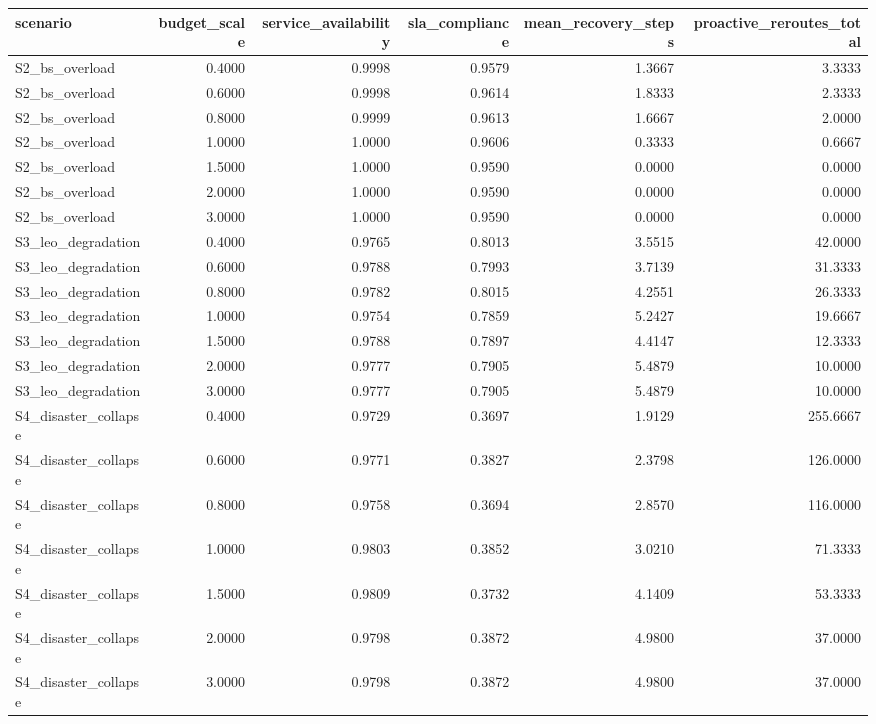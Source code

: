 \begin{tabular}{lrrrrr}
\toprule
scenario & budget\_scale & service\_availability & sla\_compliance & mean\_recovery\_steps & proactive\_reroutes\_total \\
\midrule
S2\_bs\_overload & 0.4000 & 0.9998 & 0.9579 & 1.3667 & 3.3333 \\
S2\_bs\_overload & 0.6000 & 0.9998 & 0.9614 & 1.8333 & 2.3333 \\
S2\_bs\_overload & 0.8000 & 0.9999 & 0.9613 & 1.6667 & 2.0000 \\
S2\_bs\_overload & 1.0000 & 1.0000 & 0.9606 & 0.3333 & 0.6667 \\
S2\_bs\_overload & 1.5000 & 1.0000 & 0.9590 & 0.0000 & 0.0000 \\
S2\_bs\_overload & 2.0000 & 1.0000 & 0.9590 & 0.0000 & 0.0000 \\
S2\_bs\_overload & 3.0000 & 1.0000 & 0.9590 & 0.0000 & 0.0000 \\
S3\_leo\_degradation & 0.4000 & 0.9765 & 0.8013 & 3.5515 & 42.0000 \\
S3\_leo\_degradation & 0.6000 & 0.9788 & 0.7993 & 3.7139 & 31.3333 \\
S3\_leo\_degradation & 0.8000 & 0.9782 & 0.8015 & 4.2551 & 26.3333 \\
S3\_leo\_degradation & 1.0000 & 0.9754 & 0.7859 & 5.2427 & 19.6667 \\
S3\_leo\_degradation & 1.5000 & 0.9788 & 0.7897 & 4.4147 & 12.3333 \\
S3\_leo\_degradation & 2.0000 & 0.9777 & 0.7905 & 5.4879 & 10.0000 \\
S3\_leo\_degradation & 3.0000 & 0.9777 & 0.7905 & 5.4879 & 10.0000 \\
S4\_disaster\_collapse & 0.4000 & 0.9729 & 0.3697 & 1.9129 & 255.6667 \\
S4\_disaster\_collapse & 0.6000 & 0.9771 & 0.3827 & 2.3798 & 126.0000 \\
S4\_disaster\_collapse & 0.8000 & 0.9758 & 0.3694 & 2.8570 & 116.0000 \\
S4\_disaster\_collapse & 1.0000 & 0.9803 & 0.3852 & 3.0210 & 71.3333 \\
S4\_disaster\_collapse & 1.5000 & 0.9809 & 0.3732 & 4.1409 & 53.3333 \\
S4\_disaster\_collapse & 2.0000 & 0.9798 & 0.3872 & 4.9800 & 37.0000 \\
S4\_disaster\_collapse & 3.0000 & 0.9798 & 0.3872 & 4.9800 & 37.0000 \\
\bottomrule
\end{tabular}
